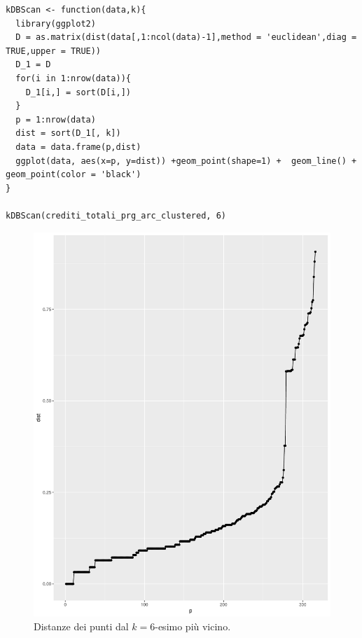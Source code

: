 \documentclass[12pt]{article}
\begin{document}
\begin{minipage}{\linewidth}
\begin{lstlisting}[caption={Codice R per il calcolo del grafico della k-esima distanza da ogni punto del dataset.}, label={rknn}, captionpos=b, style = R]
kDBScan <- function(data,k){
  library(ggplot2)
  D = as.matrix(dist(data[,1:ncol(data)-1],method = 'euclidean',diag = TRUE,upper = TRUE))
  D_1 = D
  for(i in 1:nrow(data)){
    D_1[i,] = sort(D[i,])
  }
  p = 1:nrow(data)
  dist = sort(D_1[, k])
  data = data.frame(p,dist)
  ggplot(data, aes(x=p, y=dist)) +geom_point(shape=1) +  geom_line() + geom_point(color = 'black')
}

kDBScan(crediti_totali_prg_arc_clustered, 6)
\end{lstlisting}
\end{minipage}
\begin{figure}[H]
\centering
	\includegraphics[width=\textwidth]{img/eps-minpts6.pdf}
	\caption{Distanze dei punti dal $k=6$-esimo più vicino.}
	\label{fig:eps-minpts6}
\end{figure}
\end{document}
